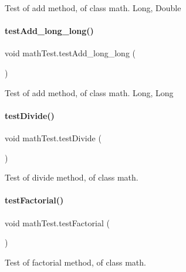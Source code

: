 Test of add method, of class math. Long, Double \mbox{\label{classmathTest_ab4ec2fd96a11cbee844a295518f0474d}} 
\paragraph{\texorpdfstring{test\+Add\+\_\+long\+\_\+long()}{testAdd\_long\_long()}}
{\footnotesize\ttfamily void math\+Test.\+test\+Add\+\_\+long\+\_\+long (\begin{DoxyParamCaption}{ }\end{DoxyParamCaption})\hspace{0.3cm}{\ttfamily [inline]}}

Test of add method, of class math. Long, Long \mbox{\label{classmathTest_a8f0ef65453e1f02809813e508f71ec07}} 
\paragraph{\texorpdfstring{test\+Divide()}{testDivide()}}
{\footnotesize\ttfamily void math\+Test.\+test\+Divide (\begin{DoxyParamCaption}{ }\end{DoxyParamCaption})\hspace{0.3cm}{\ttfamily [inline]}}

Test of divide method, of class math. \mbox{\label{classmathTest_acfb432a0a42c093d4ff07f6a2d217f70}} 
\paragraph{\texorpdfstring{test\+Factorial()}{testFactorial()}}
{\footnotesize\ttfamily void math\+Test.\+test\+Factorial (\begin{DoxyParamCaption}{ }\end{DoxyParamCaption})\hspace{0.3cm}{\ttfamily [inline]}}

Test of factorial method, of class math. \mbox{\label{classmathTest_a9f61b4253c0fdb04a3ba7552703a8879}} 
